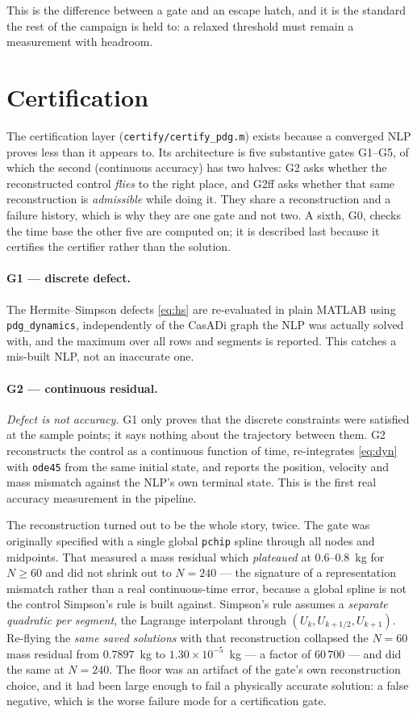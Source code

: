 \documentclass[11pt]{article}
\begin{document}
This is the difference between a gate and an escape hatch, and it is the
standard the rest of the campaign is held to: a relaxed threshold must
remain a measurement with headroom.

\section{Certification}
\label{sec:certify}

The certification layer (\texttt{certify/certify\_pdg.m}) exists because a
converged NLP proves less than it appears to. Its architecture is five
substantive gates G1--G5, of which the second (continuous accuracy) has two
halves: G2 asks whether the reconstructed control \emph{flies} to the right
place, and G2ff asks whether that same reconstruction is \emph{admissible}
while doing it. They share a reconstruction and a failure history, which is
why they are one gate and not two. A sixth, G0, checks the time base the
other five are computed on; it is described last because it certifies the
certifier rather than the solution.

\paragraph{G1 --- discrete defect.}
The Hermite--Simpson defects \eqref{eq:hs} are re-evaluated in plain MATLAB
using \texttt{pdg\_dynamics}, independently of the CasADi graph the NLP was
actually solved with, and the maximum over all rows and segments is
reported. This catches a mis-built NLP, not an inaccurate one.

\paragraph{G2 --- continuous residual.}
\emph{Defect is not accuracy.} G1 only proves that the discrete constraints
were satisfied at the sample points; it says nothing about the trajectory
between them. G2 reconstructs the control as a continuous function of time,
re-integrates \eqref{eq:dyn} with \texttt{ode45} from the same initial
state, and reports the position, velocity and mass mismatch against the
NLP's own terminal state. This is the first real accuracy measurement in the
pipeline.

The reconstruction turned out to be the whole story, twice. The gate was
originally specified with a single global \texttt{pchip} spline through all
nodes and midpoints. That measured a mass residual which \emph{plateaued} at
$0.6$--$0.8$~kg for $N \ge 60$ and did not shrink out to $N = 240$ --- the
signature of a representation mismatch rather than a real continuous-time
error, because a global spline is not the control Simpson's rule is built
against. Simpson's rule assumes a \emph{separate quadratic per segment}, the
Lagrange interpolant through $(U_k, U_{k+1/2}, U_{k+1})$. Re-flying the
\emph{same saved solutions} with that reconstruction collapsed the $N=60$
mass residual from $0.7897$~kg to $1.30\times10^{-5}$~kg --- a factor of
$60\,700$ --- and did the same at $N = 240$. The floor was an artifact of
the gate's own reconstruction choice, and it had been large enough to fail a
physically accurate solution: a false negative, which is the worse failure
mode for a certification gate.
\end{document}
